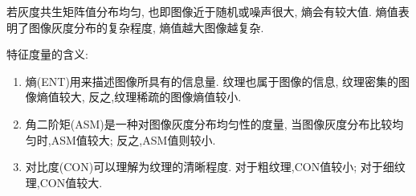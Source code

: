 若灰度共生矩阵值分布均匀,%
也即图像近于随机或噪声很大,%
熵会有较大值.%
熵值表明了图像灰度分布的复杂程度,%
熵值越大图像越复杂.

特征度量的含义:
\begin{enumerate}
\item{熵(ENT)用来描述图像所具有的信息量.%
    纹理也属于图像的信息,%
    纹理密集的图像熵值较大,%
    反之,纹理稀疏的图像熵值较小.
  }
\item{角二阶矩(ASM)是一种对图像灰度分布均匀性的度量,%
    当图像灰度分布比较均匀时,ASM值较大;%
    反之,ASM值则较小.
  }
\item{对比度(CON)可以理解为纹理的清晰程度.%
    对于粗纹理,CON值较小;%
    对于细纹理,CON值较大.
}
\end{enumerate}

    
